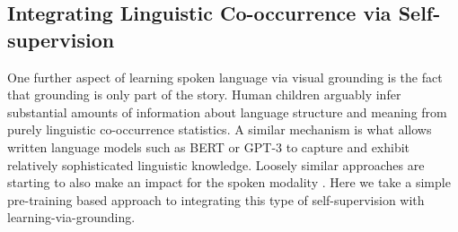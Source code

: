  

\subsection{Integrating Linguistic Co-occurrence via Self-supervision}
One further aspect of learning spoken language via visual grounding is
the fact that grounding is only part of the story. Human children
arguably infer substantial amounts of information about language
structure and meaning from purely linguistic co-occurrence
statistics. A similar mechanism is what allows written language models
such as BERT \citep{devlin-etal-2019-bert} or GPT-3 \citep{brown2020language} 
to capture and exhibit relatively sophisticated
linguistic knowledge. Loosely similar approaches are starting to also
make an impact for the spoken modality
\citep[e.g.][]{wav2vec2,hsu2021hubert}. Here we take a simple
pre-training based approach to integrating this type of
self-supervision with learning-via-grounding.



